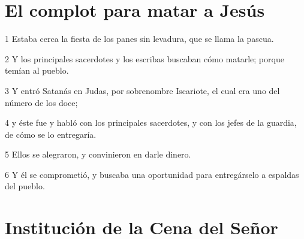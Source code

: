 \section*{El complot para matar a Jesús}

\par 1 Estaba cerca la fiesta de los panes sin levadura, que se llama la pascua.
\par 2 Y los principales sacerdotes y los escribas buscaban cómo matarle; porque temían al pueblo.
\par 3 Y entró Satanás en Judas, por sobrenombre Iscariote, el cual era uno del número de los doce;
\par 4 y éste fue y habló con los principales sacerdotes, y con los jefes de la guardia, de cómo se lo entregaría.
\par 5 Ellos se alegraron, y convinieron en darle dinero.
\par 6 Y él se comprometió, y buscaba una oportunidad para entregárselo a espaldas del pueblo.

\section*{Institución de la Cena del Señor}

